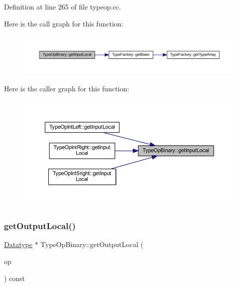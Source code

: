 Definition at line 265 of file typeop.\+cc.

Here is the call graph for this function\+:
\nopagebreak
\begin{figure}[H]
\begin{center}
\leavevmode
\includegraphics[width=350pt]{class_type_op_binary_a6b8460b8ee0e97579321c6d02fe4fd29_cgraph}
\end{center}
\end{figure}
Here is the caller graph for this function\+:
\nopagebreak
\begin{figure}[H]
\begin{center}
\leavevmode
\includegraphics[width=350pt]{class_type_op_binary_a6b8460b8ee0e97579321c6d02fe4fd29_icgraph}
\end{center}
\end{figure}
\mbox{\label{class_type_op_binary_a183a65ebb3716a380229e38c3383fd98}} 
\subsubsection{\texorpdfstring{getOutputLocal()}{getOutputLocal()}}
{\footnotesize\ttfamily \mbox{\hyperlink{class_datatype}{Datatype}} $\ast$ Type\+Op\+Binary\+::get\+Output\+Local (\begin{DoxyParamCaption}\item[{const \mbox{\hyperlink{class_pcode_op}{Pcode\+Op}} $\ast$}]{op }\end{DoxyParamCaption}) const\hspace{0.3cm}{\ttfamily [virtual]}}



